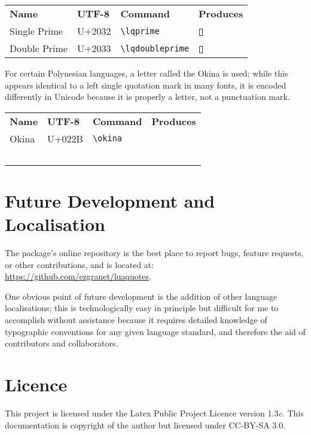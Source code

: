 \documentclass{article}
\newcommand{\thebox}{{\boxy ▯}}
\begin{document}
\begin{center}
\begin{longtable}{p{3cm}p{1.5cm}p{2.4cm}p{2.5cm}}
\textbf{Name} & \textbf{UTF-8} & \textbf{Command} & \textbf{Produces}\\
	Single Prime & \ttfamily U+2032 & \verb!\lqprime! & \Huge\thebox\lqprime\\
		Double Prime & \ttfamily U+2033 & \verb!\lqdoubleprime! & \Huge\thebox\lqdoubleprime
\end{longtable}
		\end{center}





For certain Polynesian languages, a letter called the \okina Okina is used; while this appears identical to a left single quotation mark in many fonts, it is encoded differently in Unicode because it is properly a letter, not a punctuation mark. 

	
	
	
	\begin{center}
\begin{longtable}{p{3cm}p{1.5cm}p{2cm}p{2.5cm}}
\textbf{Name} & \textbf{UTF-8} & \textbf{Command} & \textbf{Produces}\\
	Okina & \ttfamily U+022B & \verb!\okina! & \Huge\okina\thebox\\\


\end{longtable}
\end{center}
	
	
	
	
	\section{Future Development and Localisation}
	The package's online repository is the best place to report bugs, feature requests, or other contributions, and is located at: \\\url{https://github.com/ezgranet/luaquotes}. 
	
	One obvious point of future development is the addition of other language localisations; this is technologically easy in principle but difficult for me to accomplish without assistance because it requires detailed knowledge of typographic conventions for any given language standard, and therefore the aid of contributors and collaborators.  	\section{Licence}
	This project is licensed under the Latex Public Project Licence version 1.3\textit{c}. This documentation is copyright of the author but licensed under CC-BY-SA 3.0. 
	
\end{document}
